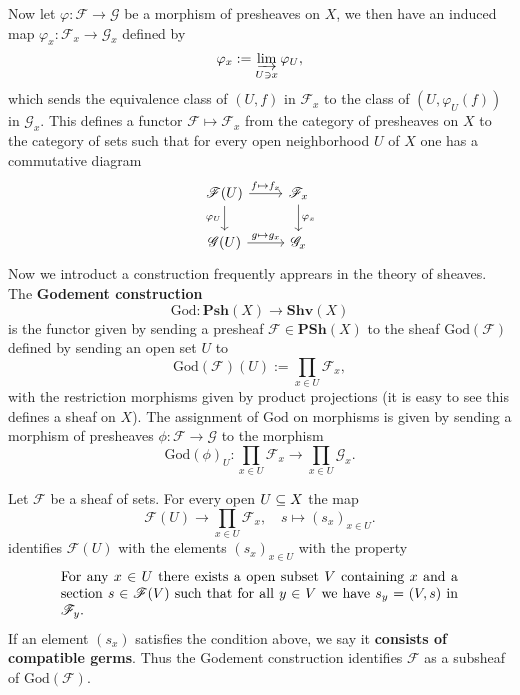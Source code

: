 Now let $\varphi:\mathscr{F}\to\mathscr{G}$ be a morphism of presheaves on $X$, we then have an induced map $\varphi_x:\mathscr{F}_x\to\mathscr{G}_x$ defined by
\[\varphi_x:=\varinjlim\limits_{U\ni x}\varphi_U,\]
which sends the equivalence class of $(U,f)$ in $\mathscr{F}_x$ to the class of $(U,\varphi_U(f))$ in $\mathscr{G}_x$. This defines a functor $\mathscr{F}\mapsto\mathscr{F}_x$ from the category of presheaves on $X$ to the category of sets such that for every open neighborhood $U$ of $X$ one has a commutative diagram
\begin{equation}\label{presheaf morphism induced on stalk}
\begin{tikzcd}
\mathscr{F}(U)\ar[r,"f\mapsto f_x"]\ar[d,swap,"\varphi_U"]&\mathscr{F}_x\ar[d,"\varphi_x"]\\
\mathscr{G}(U)\ar[r,"g\mapsto g_x"]&\mathscr{G}_x
\end{tikzcd}
\end{equation}
Now we introduct a construction frequently apprears in the theory of sheaves. The \textbf{Godement construction} 
\[\mathrm{God}:\mathbf{Psh}(X)\to\mathbf{Shv}(X)\]
is the functor given by sending a presheaf $\mathscr{F}\in\mathbf{PSh}(X)$ to the sheaf $\mathrm{God}(\mathscr{F})$ defined by sending an open set $U$ to
\[\mathrm{God}(\mathscr{F})(U):=\prod_{x\in U}\mathscr{F}_x,\]
with the restriction morphisms given by product projections (it is easy to see this defines a sheaf on $X$). The assignment of $\mathrm{God}$ on morphisms is given by sending a morphism of presheaves $\phi:\mathscr{F}\to\mathscr{G}$ to the morphism
\[\mathrm{God}(\phi)_U:\prod_{x\in U}\mathscr{F}_x\to\prod_{x\in U}\mathscr{G}_x.\]
\begin{proposition}\label{Goement construction image of sheaf char}
Let $\mathscr{F}$ be a sheaf of sets. For every open $U\subseteq X$ the map
\[\mathscr{F}(U)\to\prod_{x\in U}\mathscr{F}_x,\quad s\mapsto (s_x)_{x\in U}.\]
identifies $\mathscr{F}(U)$ with the elements $(s_x)_{x\in U}$ with the property
\begin{equation*}
\parbox{\dimexpr\linewidth-6em}
{\strut
For any $x\in U$ there exists a open subset $V$ containing $x$ and a section $s\in\mathscr{F}(V)$ such that for all $y\in V$ we have $s_y=(V,s)$ in $\mathscr{F}_y$.
\strut}
\end{equation*}
If an element $(s_x)$ satisfies the condition above, we say it \textbf{consists of compatible germs}. Thus the Godement construction identifies $\mathscr{F}$ as a subsheaf of $\mathrm{God}(\mathscr{F})$.
\end{proposition}

